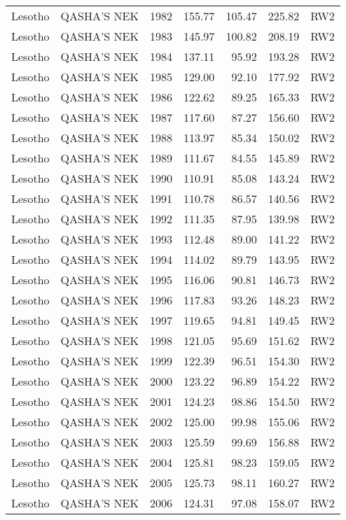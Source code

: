 \begin{longtable}{lllrrrl}
  Lesotho & QASHA'S NEK & 1982 & 155.77 & 105.47 & 225.82 & RW2 \\ 
  Lesotho & QASHA'S NEK & 1983 & 145.97 & 100.82 & 208.19 & RW2 \\ 
  Lesotho & QASHA'S NEK & 1984 & 137.11 & 95.92 & 193.28 & RW2 \\ 
  Lesotho & QASHA'S NEK & 1985 & 129.00 & 92.10 & 177.92 & RW2 \\ 
  Lesotho & QASHA'S NEK & 1986 & 122.62 & 89.25 & 165.33 & RW2 \\ 
  Lesotho & QASHA'S NEK & 1987 & 117.60 & 87.27 & 156.60 & RW2 \\ 
  Lesotho & QASHA'S NEK & 1988 & 113.97 & 85.34 & 150.02 & RW2 \\ 
  Lesotho & QASHA'S NEK & 1989 & 111.67 & 84.55 & 145.89 & RW2 \\ 
  Lesotho & QASHA'S NEK & 1990 & 110.91 & 85.08 & 143.24 & RW2 \\ 
  Lesotho & QASHA'S NEK & 1991 & 110.78 & 86.57 & 140.56 & RW2 \\ 
  Lesotho & QASHA'S NEK & 1992 & 111.35 & 87.95 & 139.98 & RW2 \\ 
  Lesotho & QASHA'S NEK & 1993 & 112.48 & 89.00 & 141.22 & RW2 \\ 
  Lesotho & QASHA'S NEK & 1994 & 114.02 & 89.79 & 143.95 & RW2 \\ 
  Lesotho & QASHA'S NEK & 1995 & 116.06 & 90.81 & 146.73 & RW2 \\ 
  Lesotho & QASHA'S NEK & 1996 & 117.83 & 93.26 & 148.23 & RW2 \\ 
  Lesotho & QASHA'S NEK & 1997 & 119.65 & 94.81 & 149.45 & RW2 \\ 
  Lesotho & QASHA'S NEK & 1998 & 121.05 & 95.69 & 151.62 & RW2 \\ 
  Lesotho & QASHA'S NEK & 1999 & 122.39 & 96.51 & 154.30 & RW2 \\ 
  Lesotho & QASHA'S NEK & 2000 & 123.22 & 96.89 & 154.22 & RW2 \\ 
  Lesotho & QASHA'S NEK & 2001 & 124.23 & 98.86 & 154.50 & RW2 \\ 
  Lesotho & QASHA'S NEK & 2002 & 125.00 & 99.98 & 155.06 & RW2 \\ 
  Lesotho & QASHA'S NEK & 2003 & 125.59 & 99.69 & 156.88 & RW2 \\ 
  Lesotho & QASHA'S NEK & 2004 & 125.81 & 98.23 & 159.05 & RW2 \\ 
  Lesotho & QASHA'S NEK & 2005 & 125.73 & 98.11 & 160.27 & RW2 \\ 
  Lesotho & QASHA'S NEK & 2006 & 124.31 & 97.08 & 158.07 & RW2 \\ 

\end{longtable}
